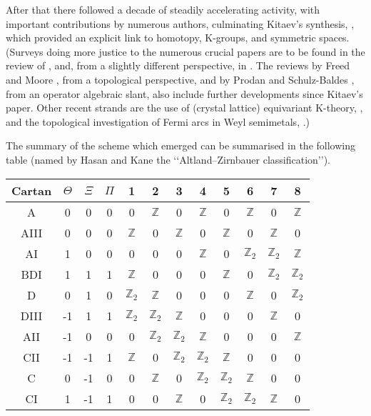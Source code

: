 \documentclass[11pt]{article}
\newcommand{\integer}{{\mathbb Z}}
\begin{document}
After that there followed a decade of steadily accelerating activity, with important contributions by numerous authors, culminating Kitaev's synthesis, \cite{K09}, which provided an explicit link to homotopy, K-groups, and symmetric spaces. 
(Surveys doing more justice to the numerous crucial papers are to be found in the review of \cite{HK}, and, from a slightly different perspective, in \cite{SCR}. The reviews by Freed and Moore \cite{FM}, from a topological perspective, and by Prodan and Schulz-Baldes \cite{PS}, from an operator algebraic slant,   also include further developments since Kitaev's paper. Other recent strands are the use of (crystal lattice) equivariant K-theory,  \cite{KS17},
and the topological investigation of Fermi arcs in Weyl semimetals, \cite{MT5,MT6}.)

The summary of the scheme which emerged can be summarised in the following table (named by
Hasan and Kane the \lq\lq Altland--Zirnbauer classification\rq\rq).
\begin{center}
	\begin{tabular}{|c| c c c| c c c c c c c c|}\hline
 Cartan    &$\Theta$ &$\Xi$ &$\Pi$ &1 &2 &3 &4 &5 &6 &7 &8\\ \hline
A  &0 &0 &0  &0 &$\integer$&0 &$\integer$&0 &$\integer$&0 &$\integer$\\
AIII  &0 &0 &0 &$\integer$ &0 &$\integer$&0 &$\integer$&0 &$\integer$ &0\\\hline \hline
AI  &1 &0 &0 &0 &0 &0  &$\integer$ &0 &$\integer_2$ &$\integer_2$ &$\integer$\\
BDI  &1 &1 &1 &$\integer$ &0 &0 &0  &$\integer$ &0 &$\integer_2$ &$\integer_2$\\ 
D &0 &1 &0 &$\integer_2$ &$\integer$ &0 &0 &0  &$\integer$ &0 &$\integer_2$ \\ 
DIII  &-1 &1 &1 &$\integer_2$ &$\integer_2$ &$\integer$ &0 &0 &0  &$\integer$ &0 \\
AII  &-1 &0 &0 &0 &$\integer_2$ &$\integer_2$ &$\integer$ &0 &0 &0  &$\integer$\\
CII  &-1 &-1 &1  &$\integer$ &0 &$\integer_2$ &$\integer_2$ &$\integer$ &0 &0 &0 \\
C  &0 &-1 &0 &0 &$\integer$ &0 &$\integer_2$ &$\integer_2$ &$\integer$ &0 &0 \\
CI  &1 &-1 &1  &0 &0 &$\integer$ &0 &$\integer_2$ &$\integer_2$ &$\integer$ &0\\ \hline
\end{tabular}
\end{center}
\end{document}
